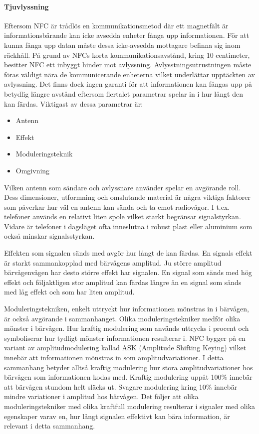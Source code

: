 \documentclass[11pt]{article}
\begin{document}
\paragraph{Tjuvlyssning}
Eftersom NFC är trådlös en kommunikationsmetod där ett magnetfält är informationsbärande kan icke avsedda enheter fånga upp informationen. För att kunna fånga upp datan måste dessa icke-avsedda mottagare befinna sig inom räckhåll. På grund av NFCs korta kommunikationsavstånd, kring 10 centimeter, besitter NFC ett inbyggt hinder mot avlyssning. Avlysstningsutrustningen måste föras väldigt nära de kommunicerande enheterna vilket underlättar upptäckten av avlyssning. Det finns dock ingen garanti för att informationen kan fångas upp på betydlig längre avstånd eftersom flertalet parametrar spelar in i hur långt den kan färdas. Viktigast av dessa parametrar är:

\begin{itemize}
\item Antenn
\item Effekt
\item Moduleringsteknik
\item Omgivning
\end{itemize}

Vilken antenn som sändare och avlyssnare använder spelar en avgörande roll. Dess dimensioner, utformning och omslutande material är några viktiga faktorer som påverkar hur väl en antenn kan sända och ta emot radiovågor. I t.ex. telefoner används en relativt liten spole vilket starkt begränsar signalstyrkan. Vidare är telefoner i dagsläget ofta inneslutna i robust plast eller aluminium som också minskar signalsstyrkan.

Effekten som signalen sänds med avgör hur långt de kan färdas. En signals effekt är starkt sammankopplad med bärvågens amplitud. Ju större amplitud bärvågenvågen har desto större effekt har signalen. En signal som sänds med hög effekt och följaktligen stor amplitud kan färdas längre än en signal som sänds med låg effekt och som har liten amplitud. 

Moduleringstekniken, enkelt uttryckt hur informationen mönstras in i bärvågen, är också avgörande i sammanhanget. Olika moduleringstekniker medför olika mönster i bärvågen. Hur kraftig modulering som används uttrycks i procent och symboliserar hur tydligt mönster informationen resulterar i. NFC bygger på en variant av amplitudmodulering kallad ASK (Amplitude Shifting Keying) vilket innebär att informationen mönstras in som amplitudvariationer. I detta sammanhang betyder alltså kraftig modulering hur stora amplitudvariationer hos bärvågen som informationen kodas med. Kraftig modulering uppåt 100\% innebär att bärvågen stundom helt släcks ut. Svagare modulering kring 10\% innebär mindre variationer i amplitud hos bärvågen. Det följer att olika moduleringstekniker med olika kraftfull modulering resulterar i signaler med olika egenskaper varav en, hur långt signalen effektivt kan bära information, är relevant i detta sammanhang.
\end{document}
